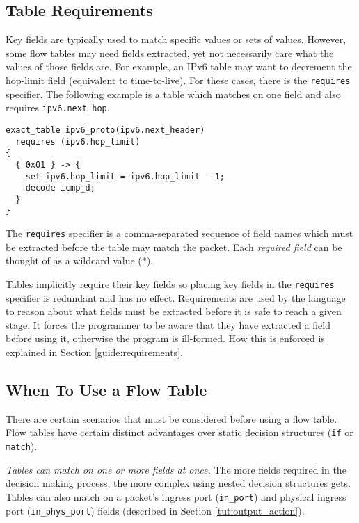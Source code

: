 \subsection{Table Requirements} \label{tut:table_req}

Key fields are typically used to match specific values or sets of values. However, some flow tables may need fields extracted, yet not
necessarily care what the values of those fields are. 
For example, an IPv6 table
may want to decrement the hop-limit field (equivalent to time-to-live).
For these cases, there is the \texttt{requires} specifier.
The following example is a table which matches on one field and also requires
\texttt{ipv6.next\_hop}.

\begin{codepage}
\begin{lstlisting}
exact_table ipv6_proto(ipv6.next_header)
  requires (ipv6.hop_limit) 
{
  { 0x01 } -> {
  	set ipv6.hop_limit = ipv6.hop_limit - 1; 
  	decode icmp_d;
  }
}
\end{lstlisting}
\end{codepage}

The \texttt{requires} specifier is a comma-separated sequence of field names
which must be extracted before the table may match the packet.
Each \textit{required field} can be thought of as a wildcard value (*).

Tables implicitly require their key fields so placing key fields
in the \texttt{requires} specifier is redundant and has no effect. 
Requirements are used by the language to reason about what
fields must be extracted before it is safe to reach a given stage.
It forces the programmer to be aware that they have extracted
a field before using it, otherwise the program is ill-formed. 
How this is enforced is explained in Section \ref{guide:requirements}.

\subsection{When To Use a Flow Table} \label{tut:why_tables}

There are certain scenarios that must be considered before using a
flow table. Flow tables have certain distinct advantages over
static decision structures (\texttt{if} or \texttt{match}).

\textit{Tables can match on one or more fields at once.} The more fields
required in the decision making process, the more complex using nested decision
structures gets. Tables can also match on a packet's ingress port
(\texttt{in\_port}) and physical ingress port (\texttt{in\_phys\_port}) fields
(described in Section \ref{tut:output_action}).

